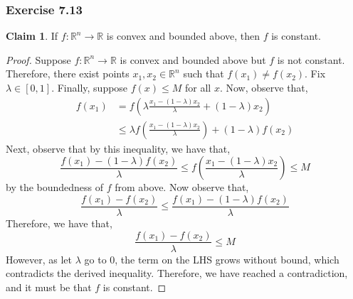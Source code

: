 \documentclass[letterpaper,12pt]{article}
\theoremstyle{definition}
\newtheorem{claim}[theorem]{Claim}
\begin{document}
\subsubsection*{Exercise 7.13} 
\begin{claim}
	If $f: \mathbb{R}^n \to \mathbb{R}$ is convex and bounded above, then $f$ is constant. 
\end{claim}
\begin{proof}
	Suppose $f: \mathbb{R}^n \to \mathbb{R}$ is convex and bounded above but $f$ is not constant. Therefore, there exist points $x_1, x_2 \in \mathbb{R}^n$ such that $f(x_1) \neq f(x_2)$. Fix $\lambda \in [0,1]$.  Finally, suppose $f(x) \leq M$ for all $x$. Now, observe that,
	\begin{align*}
	f(x_1) &= f\left(\lambda \frac{x_1 - (1 - \lambda)x_2}{\lambda} + (1 - \lambda)x_2\right) \\
	&\leq \lambda  f\left(\frac{x_1 - (1 - \lambda)x_2}{\lambda}\right)+ (1 - \lambda)f(x_2) \tag{by the convexity of $f$}
	\end{align*}
	Next, observe that by this inequality, we have that,
	\begin{equation}
	\frac{f(x_1) - (1 - \lambda) f(x_2)}{\lambda} \leq f\left(\frac{x_1 - (1 - \lambda)x_2}{\lambda}\right) \leq M
	\end{equation}
	by the boundedness of $f$ from above. Now observe that,
	\begin{equation}
	\frac{f(x_1) - f(x_2)}{\lambda} \leq \frac{f(x_1) - (1 - \lambda) f(x_2)}{\lambda}
	\end{equation}
	Therefore, we have that,
	\begin{equation}
	\frac{f(x_1) - f(x_2)}{\lambda} \leq  M
	\end{equation}
	However, as let $\lambda$ go to $0$, the term on the LHS grows without bound, which contradicts the derived inequality. Therefore, we have reached a contradiction, and it must be that  $f$ is constant. 
\end{proof}
\end{document}
